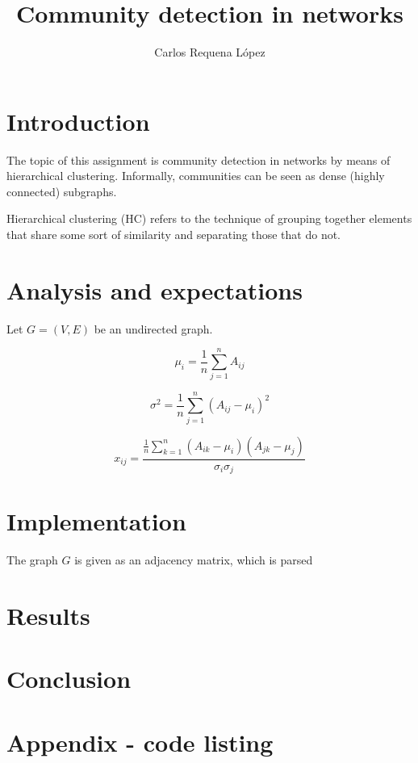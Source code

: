 \documentclass[12pt,a4paper]{article}
\title{Community detection in networks}
\author{Carlos Requena López}
\begin{document}
\thispagestyle{fancy}
\maketitle
\thispagestyle{fancy}

\section{Introduction}

The topic of this assignment is community detection in networks by
means of hierarchical clustering. Informally, communities can be seen
as dense (highly connected) subgraphs.

Hierarchical clustering (HC) refers to the technique of grouping
together elements that share some sort of similarity and separating
those that do not.

\section{Analysis and expectations}

Let $ G = (V, E) $ be an undirected graph.

$$ \mu_i = \frac{1}{n} \sum_{j=1}^{n} A_{ij} $$

$$ \sigma^2 = \frac{1}{n} \sum_{j=1}^{n} (A_{ij} - \mu_i)^2 $$

$$ x_{ij} = \frac{\frac{1}{n}\sum_{k=1}^{n}(A_{ik} - \mu_i)(A_{jk}-\mu_j)}{\sigma_i\sigma_j} $$

\section{Implementation}

The graph $ G $ is given as an adjacency matrix, which is parsed

\section{Results}

\section{Conclusion}




\nocite{*}

\appendix
\section{Appendix - code listing}

\inputminted{python}{../src/main.py}

\end{document}
